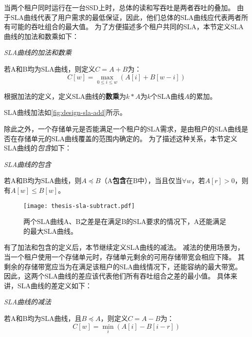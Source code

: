当两个租户同时运行在一台SSD上时，总体的读和写吞吐是两者吞吐的叠加。
由于SLA曲线代表了用户需求的最低保证，因此，他们总体的SLA曲线应代表两者所有可能的吞吐组合的最大值。
为了方便描述多个租户共同的SLA，本节定义SLA曲线的加法和数乘如下：

\begin{definition}
  \textit{SLA曲线的加法和数乘}

  若A和B均为SLA曲线，则定义$C=A+B$为：
  \begin{equation}
    C[w] = \max_{0 \le i \le w} (A[i] + B[w - i])
  \end{equation}

  根据加法的定义，定义SLA曲线的\textbf{数乘}为$k * A$为$k$个SLA曲线$A$的累加。

\end{definition}

SLA曲线加法如\autoref{fig:design-sla-add}所示。

除此之外，一个存储单元是否能满足一个租户的SLA需求，是由租户的SLA曲线是否在存储单元的SLA曲线覆盖的范围内确定的。
为了描述这种关系，本节定义SLA曲线的\textit{包含}如下：

\begin{definition}
  \textit{SLA曲线的包含}

  若A和B均为SLA曲线，则$A\preceq B$（A\textbf{包含}在B中），当且仅当$\forall w$，若$A[r] > 0$，则有$A[w] \le B[w]$。
\end{definition}

\begin{figure}[h]
  \centering
  \texttt{[image: thesis-sla-subtract.pdf]}
  \caption{
        两个SLA曲线A、B之差是在满足B的SLA要求的情况下，A还能满足的最大SLA曲线。
      }
  \label{fig:design-sla-subtract}
\end{figure}

有了加法和包含的定义后，本节继续定义SLA曲线的减法。
减法的使用场景为，当一个租户使用一个存储单元时，存储单元剩余的可用存储带宽会相应下降。
其剩余的存储带宽应当为在满足该租户的SLA曲线情况下，还能容纳的最大带宽。
因此，这两个SLA曲线的差应该代表他们所有吞吐组合之差的最小值。
具体来讲，SLA曲线的差定义如下：

\begin{definition}
  \textit{SLA曲线的减法}

  若A和B均为SLA曲线，且$B \preceq A$，则定义$C=A-B$为：
  \begin{equation}
    C[w] = \min_{i} (A[i] - B[i - r])
  \end{equation}
\end{definition}

